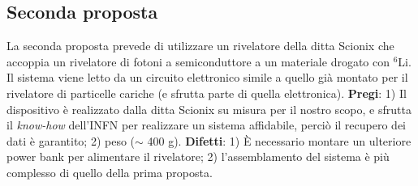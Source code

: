 \subsection{Seconda proposta}
La seconda proposta prevede di utilizzare un rivelatore della ditta Scionix che accoppia un rivelatore di fotoni a semiconduttore a un materiale drogato con $^6$Li. Il sistema viene letto da un circuito elettronico simile a quello già montato per il rivelatore di particelle cariche (e sfrutta parte di quella elettronica).
\textbf{Pregi}: 1) Il dispositivo è realizzato dalla ditta Scionix su misura per il nostro scopo, e sfrutta il \emph{know-how} dell'INFN per realizzare un sistema affidabile, perciò il recupero dei dati è garantito; 2) peso ($\sim$ 400 g).
\textbf{Difetti}: 1)  \`E necessario montare un ulteriore power bank per alimentare il rivelatore; 2) l'assemblamento del sistema è più complesso di quello della prima proposta. 



